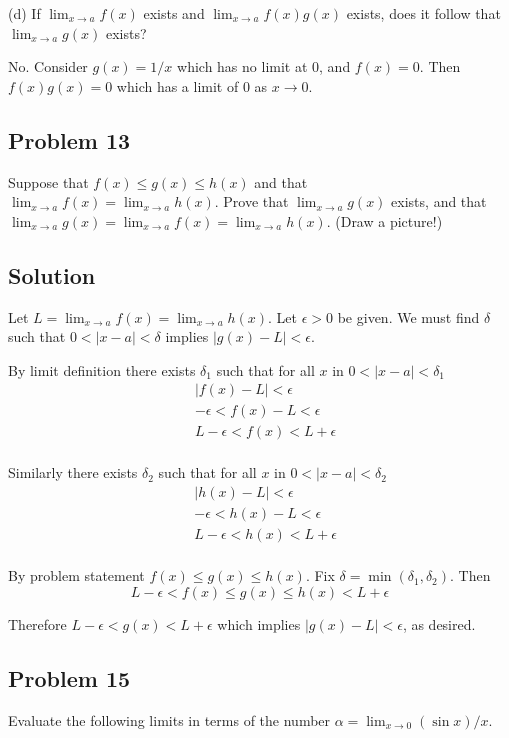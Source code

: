 \vs

(d) If $\lim_{x\to a}f(x)$ exists and $\lim_{x\to a}f(x)g(x)$ exists, does it follow that $\lim_{x\to a}g(x)$ exists?

\vs

No. Consider $g(x)=1/x$ which has no limit at $0$, and $f(x)=0$. Then $f(x)g(x)=0$ which has a limit of $0$ as $x\to 0$.

\subsection*{Problem 13}
Suppose that $f(x)\leq g(x)\leq h(x)$ and that $\lim_{x\to a}f(x)=\lim_{x\to a} h(x)$. Prove that $\lim_{x\to a}g(x)$ exists, and that $\lim_{x\to a}g(x)=\lim_{x\to a}f(x)=\lim_{x\to a} h(x)$. (Draw a picture!)

\subsection*{Solution}
Let $L=\lim_{x\to a}f(x)=\lim_{x\to a} h(x)$. Let $\epsilon>0$ be given. We must find $\delta$ such that $0<|x-a|<\delta$ implies $|g(x)-L|<\epsilon$.

\vs

By limit definition there exists $\delta_1$ such that for all $x$ in $0<|x-a|<\delta_1$
\begin{align*}
    &|f(x)-L|<\epsilon\\
    &-\epsilon<f(x)-L<\epsilon\\
    &L-\epsilon<f(x)<L+\epsilon\\
\end{align*}

Similarly there exists $\delta_2$ such that for all $x$ in $0<|x-a|<\delta_2$
\begin{align*}
    &|h(x)-L|<\epsilon\\
    &-\epsilon<h(x)-L<\epsilon\\
    &L-\epsilon<h(x)<L+\epsilon\\
\end{align*}

By problem statement $f(x)\leq g(x)\leq h(x)$. Fix $\delta=\min(\delta_1, \delta_2)$. Then
\[L-\epsilon<f(x)\leq g(x)\leq h(x)<L+\epsilon\]

Therefore $L-\epsilon<g(x)<L+\epsilon$ which implies $|g(x)-L|<\epsilon$, as desired.

\subsection*{Problem 15}
Evaluate the following limits in terms of the number $\alpha=\lim_{x\to0}(\sin x)/x$.

